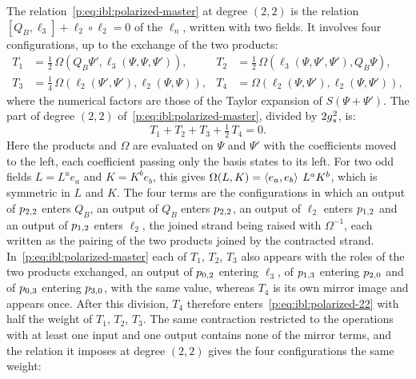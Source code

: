 The relation~\eqref{p:eq:ibl:polarized-master} at degree $(2, 2)$ is the relation $[Q_B, \ell_3] + \ell_2 \circ \ell_2 = 0$ of the $\ell_n$, written with two fields.
It involves four configurations, up to the exchange of the two products:
\begin{equation}
  \label{p:eq:ibl:configurations-22}
  \begin{aligned}
    T_1
      &
      = \tfrac{1}{2} \, \Omega(Q_B \Psi', \ell_3(\Psi, \Psi, \Psi')),
    &
    T_2
      &
      = \tfrac{1}{2} \, \Omega(\ell_3(\Psi, \Psi', \Psi'), Q_B \Psi),
    \\
    T_3
      &
      = \tfrac{1}{4} \, \Omega(\ell_2(\Psi', \Psi'), \ell_2(\Psi, \Psi)),
    &
    T_4
      &
      = \Omega(\ell_2(\Psi, \Psi'), \ell_2(\Psi, \Psi')),
  \end{aligned}
\end{equation}
where the numerical factors are those of the Taylor expansion of $S(\Psi + \Psi')$.
The part of degree $(2, 2)$ of~\eqref{p:eq:ibl:polarized-master}, divided by $2 g_s^2$, is:
\begin{equation}
  \label{p:eq:ibl:polarized-22}
  T_1 + T_2 + T_3 + \tfrac{1}{2} \, T_4
    = 0.
\end{equation}
Here the products and $\Omega$ are evaluated on $\Psi$ and $\Psi'$ with the coefficients moved to the left, each coefficient passing only the basis states to its left.
For two odd fields $L = L^a e_a$ and $K = K^b e_b$, this gives $\Omega(L, K) = \braket{e_a, e_b}_{} \, L^a K^b$, which is symmetric in $L$ and $K$.
The four terms are the configurations in which an output of $p_{2,2}$ enters $Q_B$, an output of $Q_B$ enters $p_{2,2}$, an output of $\ell_2$ enters $p_{1,2}$ and an output of $p_{1,2}$ enters $\ell_2$, the joined strand being raised with $\Omega^{-1}$, each written as the pairing of the two products joined by the contracted strand.
In~\eqref{p:eq:ibl:polarized-master} each of $T_1$, $T_2$, $T_3$ also appears with the roles of the two products exchanged, an output of $p_{0,2}$ entering $\ell_3$, of $p_{1,3}$ entering $p_{2,0}$ and of $p_{0,3}$ entering $p_{3,0}$, with the same value, whereas $T_4$ is its own mirror image and appears once.
After this division, $T_4$ therefore enters~\eqref{p:eq:ibl:polarized-22} with half the weight of $T_1$, $T_2$, $T_3$.
The same contraction restricted to the operations with at least one input and one output contains none of the mirror terms, and the relation it imposes at degree $(2, 2)$ gives the four configurations the same weight:
